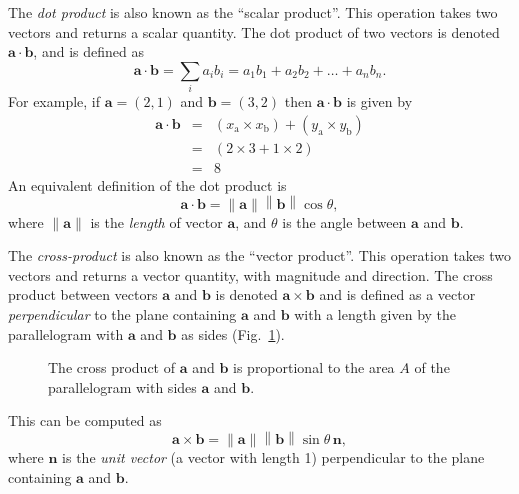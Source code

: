 \documentclass[a4paper]{article}
\renewcommand{\vec}[1]{\mathbf{#1}}
\newcommand{\norm}[1]{\left\lVert #1\right\rVert}
\begin{document}
The \emph{dot product} is also known as the ``scalar product''. This operation takes two vectors and returns a scalar quantity. The dot product of two vectors is denoted $\vec{a}\cdot\vec{b}$, and is defined as
\begin{equation}
\vec{a}\cdot\vec{b} = \sum_ia_ib_i = a_1b_1 + a_2b_2 + \ldots + a_nb_n.
\end{equation}
For example, if $\vec{a}=(2,1)$ and $\vec{b}=(3,2)$ then $\vec{a}\cdot\vec{b}$ is given by
\begin{eqnarray}
\vec{a}\cdot\vec{b} & = & (x_\mathrm{a} \times x_\mathrm{b})+ (y_\mathrm{a}\times y_\mathrm{b})\\
& = & (2\times3 + 1\times2) \\
& = & 8
\end{eqnarray}
An equivalent definition of the dot product is
\begin{equation}
\vec{a}\cdot\vec{b} = \norm{\vec{a}}\norm{\vec{b}}\cos\theta,
\end{equation}
where $\norm{\vec{a}}$ is the \emph{length} of vector $\vec{a}$, and $\theta$ is the angle between $\vec{a}$ and $\vec{b}$.

The \emph{cross-product} is also known as the ``vector product''. This operation takes two vectors and returns a vector quantity, with magnitude and direction. The cross product between vectors $\vec{a}$ and $\vec{b}$ is denoted $\vec{a}\times\vec{b}$ and is defined as a vector \emph{perpendicular} to the plane containing $\vec{a}$ and $\vec{b}$ with a length given by the parallelogram with $\vec{a}$ and $\vec{b}$ as sides (Fig.~\ref{fig:cross_product}). 
\begin{figure}[tb]
  \centering
    \caption{\label{fig:cross_product}The cross product of $\vec{a}$ and $\vec{b}$ is proportional to the area $A$ of the parallelogram with sides $\vec{a}$ and $\vec{b}$.}
\end{figure}
This can be computed as
\begin{equation}
\vec{a}\times\vec{b} = \norm{\vec{a}}\norm{\vec{b}}\sin\theta\,\vec{n},
\end{equation}
where $\vec{n}$ is the \emph{unit vector} (a vector with length 1) perpendicular to the plane containing $\vec{a}$ and $\vec{b}$.
\end{document}
